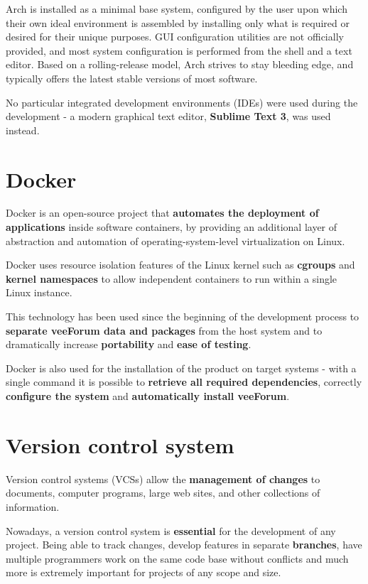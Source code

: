 \documentclass[12pt]{report}
\renewcommand\emph{\textbf}
\begin{document}
                Arch is installed as a minimal base system, configured by the user upon which their own ideal environment is assembled by installing only what is required or desired for their unique purposes. GUI configuration utilities are not officially provided, and most system configuration is performed from the shell and a text editor. Based on a rolling-release model, Arch strives to stay bleeding edge, and typically offers the latest stable versions of most software.

                No particular integrated development environments (IDEs) were used during the development - a modern graphical text editor, \emph{Sublime Text 3}, was used instead.

            \section{Docker}
                Docker is an open-source project that \emph{automates the deployment of applications} inside software containers, by providing an additional layer of abstraction and automation of operating-system-level virtualization on Linux.

                Docker uses resource isolation features of the Linux kernel such as \emph{cgroups} and \emph{kernel namespaces} to allow independent containers to run within a single Linux instance.

                This technology has been used since the beginning of the development process to \emph{separate veeForum data and packages} from the host system and to dramatically increase \emph{portability} and \emph{ease of testing}.

                Docker is also used for the installation of the product on target systems - with a single command it is possible to \emph{retrieve all required dependencies}, correctly \emph{configure the system} and \emph{automatically install veeForum}.

            \section{Version control system}
                Version control systems (VCSs) allow the \emph{management of changes} to documents, computer programs, large web sites, and other collections of information.

                Nowadays, a version control system is \emph{essential} for the development of any project. 
                Being able to track changes, develop features in separate \emph{branches}, have multiple programmers work on the same code base without conflicts and much more is extremely important for projects of any scope and size.
\end{document}
